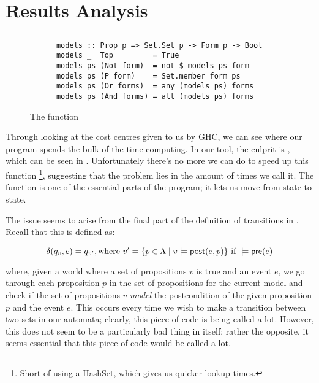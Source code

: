 \documentclass[10pt, a4paper]{report}
\begin{document}
\section{Results Analysis}

\subsection{}

\begin{wrapfigure}{r}{0.5\textwidth}
  \begin{center}
    \begin{verbatim}
      models :: Prop p => Set.Set p -> Form p -> Bool
      models _  Top         = True
      models ps (Not form)  = not $ models ps form
      models ps (P form)    = Set.member form ps
      models ps (Or forms)  = any (models ps) forms
      models ps (And forms) = all (models ps) forms
    \end{verbatim}
  \end{center}
  \caption{The  function}
  \label{fig:modelsfunction}
\end{wrapfigure}

Through looking at the cost centres given to us by GHC, we can see where our
program spends the bulk of the time computing. In our tool, the culprit is
, which can be seen in . Unfortunately
there's no more we can do to speed up this function \footnote{Short of using a
  HashSet, which gives us quicker lookup times.}, suggesting that the problem
lies in the amount of times we call it. The function is one of the essential
parts of the program; it lets us move from state to state.

The issue seems to arise from the final part of the definition of transitions in
\mestar. Recall that this is defined as:

\begin{equation} \label{eq:delta1}
  \delta(q_v, e) = q_{v'}, \text{where } v' = \{p \in \Lambda \mid v \models \textsf{post}(e, p)\}
  \text{ if } 
  \models \textsf{pre}(e)
\end{equation}

\noindent where, given a world where a set of propositions $v$ is true and an
event $e$, we go through each proposition $p$ in the set of propositions for the
current model and check if the set of propositions $v$ \emph{model} the postcondition
of the given proposition $p$ and the event $e$. This occurs every time we wish
to make a transition between two sets in our automata; clearly, this piece of
code is being called a lot. However, this does not seem to be a particularly bad
thing in itself; rather the opposite, it seems essential that this piece of code
would be called a lot.
\end{document}
